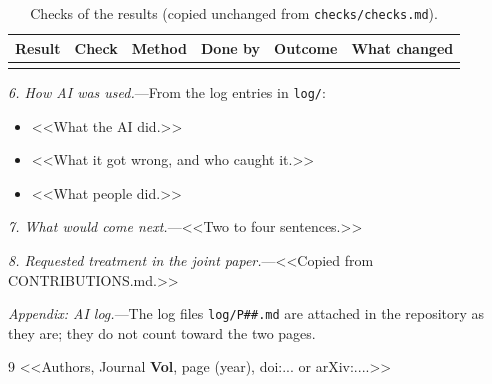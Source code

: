 \documentclass[reprint,aps,prl,superscriptaddress,amsmath,amssymb,floatfix]{revtex4-2}
\begin{document}
\begin{table}[t]
  \caption{Checks of the results (copied unchanged from \texttt{checks/checks.md}).}
  \label{tab:checks}
  \begin{ruledtabular}
  \begin{tabular}{p{2.6cm}p{4.0cm}lllp{3.8cm}}
    Result & Check & Method & Done by & Outcome & What changed \\
    \hline
     & & & & & \\
  \end{tabular}
  \end{ruledtabular}
\end{table}

\textit{6. How AI was used.}---From the log entries in \texttt{log/}:
\begin{itemize}\setlength{\itemsep}{0pt}
  \item <<What the AI did.>>
  \item <<What it got wrong, and who caught it.>>
  \item <<What people did.>>
\end{itemize}

\textit{7. What would come next.}---<<Two to four sentences.>>

\textit{8. Requested treatment in the joint paper.}---<<Copied from CONTRIBUTIONS.md.>>

\textit{Appendix: AI log.}---The log files \texttt{log/P\#\#.md} are attached in the repository as
they are; they do not count toward the two pages.

\begin{thebibliography}{9}
   <<Authors, Journal \textbf{Vol}, page (year), doi:...  or arXiv:....>>
\end{thebibliography}
\end{document}
